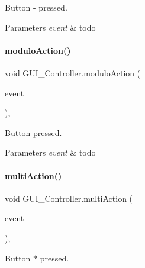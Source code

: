 Button \textquotesingle{}-\/\textquotesingle{} pressed. 


\begin{DoxyParams}{Parameters}
{\em event} & todo \\
\hline
\end{DoxyParams}
\mbox{\label{classGUI__Controller_a0a15fea5ff39777ca3ec7f52e5d35500}} 
\paragraph{\texorpdfstring{modulo\+Action()}{moduloAction()}}
{\footnotesize\ttfamily void G\+U\+I\+\_\+\+Controller.\+modulo\+Action (\begin{DoxyParamCaption}\item[{Action\+Event}]{event }\end{DoxyParamCaption})\hspace{0.3cm}{\ttfamily [inline]}, {\ttfamily [private]}}



Button \textquotesingle{}\textquotesingle{} pressed. 


\begin{DoxyParams}{Parameters}
{\em event} & todo \\
\hline
\end{DoxyParams}
\mbox{\label{classGUI__Controller_a3e8f8e68324279d1a1ca47b25f76bd03}} 
\paragraph{\texorpdfstring{multi\+Action()}{multiAction()}}
{\footnotesize\ttfamily void G\+U\+I\+\_\+\+Controller.\+multi\+Action (\begin{DoxyParamCaption}\item[{Action\+Event}]{event }\end{DoxyParamCaption})\hspace{0.3cm}{\ttfamily [inline]}, {\ttfamily [private]}}



Button \textquotesingle{}$\ast$\textquotesingle{} pressed. 


